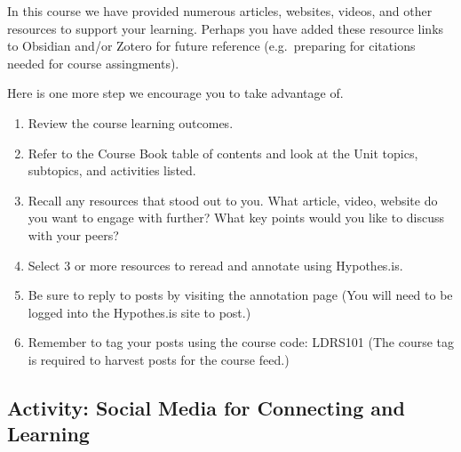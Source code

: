 \documentclass[
]{book}
\providecommand{\tightlist}{%
  \setlength{\itemsep}{0pt}\setlength{\parskip}{0pt}}
\theoremstyle{definition}
\theoremstyle{definition}
\theoremstyle{definition}
\theoremstyle{definition}
\theoremstyle{remark}
\begin{document}
\begin{reflect}
In this course we have provided numerous articles, websites, videos, and other resources to support your learning. Perhaps you have added these resource links to Obsidian and/or Zotero for future reference (e.g.~preparing for citations needed for course assingments).

Here is one more step we encourage you to take advantage of.

\begin{enumerate}
\def\labelenumi{\arabic{enumi}.}
\tightlist
\item
  Review the course learning outcomes.
\item
  Refer to the Course Book table of contents and look at the Unit topics, subtopics, and activities listed.
\item
  Recall any resources that stood out to you. What article, video, website do you want to engage with further? What key points would you like to discuss with your peers?
\item
  Select 3 or more resources to reread and annotate using Hypothes.is.
\item
  Be sure to reply to posts by visiting the annotation page (You will need to be logged into the Hypothes.is site to post.)
\item
  Remember to tag your posts using the course code: LDRS101 (The course tag is required to harvest posts for the course feed.)
\end{enumerate}
\end{reflect}

\hypertarget{activity-social-media-for-connecting-and-learning}{%
\subsection*{Activity: Social Media for Connecting and Learning}\label{activity-social-media-for-connecting-and-learning}}
\end{document}
